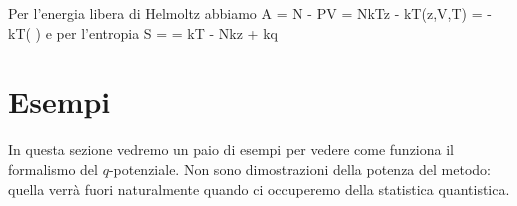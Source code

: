 Per l'energia libera di Helmoltz abbiamo
\be
A = \mu N - PV = NkT\ln z - kT\ln\calQ(z,V,T) = -kT\ln\left(  \right)
\ee
e per l'entropia
\be
S =  = kT - Nk\ln z + kq
\ee

\section{Esempi}
\label{sec:05-esempi}

In questa sezione vedremo un paio di esempi per vedere come funziona il formalismo del $q$-potenziale. Non sono dimostrazioni della potenza del metodo: quella verrà fuori naturalmente quando ci occuperemo della statistica quantistica.

